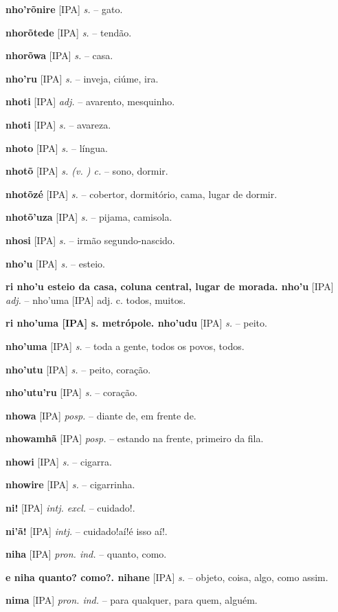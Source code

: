 \textbf{nho'rõnire} [IPA] \textit{s.} -- gato.

\textbf{nhorõtede} [IPA] \textit{s.} -- tendão.

\textbf{nhorõwa} [IPA] \textit{s.} -- casa.

\textbf{nho'ru} [IPA] \textit{s.} -- inveja, ciúme, ira.

\textbf{nhoti} [IPA] \textit{adj.} -- avarento, mesquinho.

\textbf{nhoti} [IPA] \textit{s.} -- avareza.

\textbf{nhoto} [IPA] \textit{s.} -- língua.

\textbf{nhotõ} [IPA] \textit{s. (v. ) c.} -- sono, dormir.

\textbf{nhotõzé} [IPA] \textit{s.} -- cobertor, dormitório, cama, lugar de dormir.

\textbf{nhotõ'uza} [IPA] \textit{s.} -- pijama, camisola.

\textbf{nhosi} [IPA] \textit{s.} -- irmão segundo-nascido.

\textbf{nho'u} [IPA] \textit{s.} -- esteio.

\textbf{ri nho'u esteio da casa, coluna central, lugar de morada. nho'u} [IPA] \textit{adj.} -- nho'uma [IPA] adj. c. todos, muitos.

\textbf{ri nho'uma [IPA] s. metrópole. nho'udu} [IPA] \textit{s.} -- peito.

\textbf{nho'uma} [IPA] \textit{s.} -- toda a gente, todos os povos, todos.

\textbf{nho'utu} [IPA] \textit{s.} -- peito, coração.

\textbf{nho'utu'ru} [IPA] \textit{s.} -- coração.

\textbf{nhowa} [IPA] \textit{posp.} -- diante de, em frente de.

\textbf{nhowamhã} [IPA] \textit{posp.} -- estando na frente, primeiro da fila.

\textbf{nhowi} [IPA] \textit{s.} -- cigarra.

\textbf{nhowire} [IPA] \textit{s.} -- cigarrinha.

\textbf{ni!} [IPA] \textit{intj. excl.} -- cuidado!.

\textbf{ni'ã!} [IPA] \textit{intj.} -- cuidado!aí!é isso aí!.

\textbf{niha} [IPA] \textit{pron. ind.} -- quanto, como.

\textbf{e niha quanto? como?. nihane} [IPA] \textit{s.} -- objeto, coisa, algo, como assim.

\textbf{nima} [IPA] \textit{pron. ind.} -- para qualquer, para quem, alguém.

